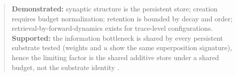 \begin{quote}
\textbf{Demonstrated:} synaptic structure is the persistent store;
creation requires budget normalization; retention is bounded by decay
and order; retrieval-by-forward-dynamics exists for trace-level
configurations.\\[1pt]
\textbf{Supported:} the information bottleneck is shared by every
persistent substrate tested (weights and \(u\) show the same
superposition signature), hence the limiting factor is the shared
additive store under a shared budget, not the substrate identity
\cite{synmem}.
\end{quote}